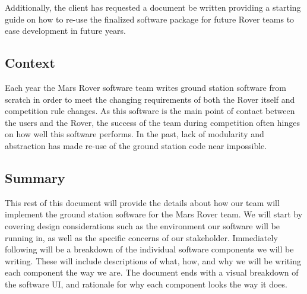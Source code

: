 Additionally, the client has requested a document be written providing a starting guide on how to re-use the finalized software package for future Rover teams to ease development in future years.


\subsection{Context}
Each year the Mars Rover software team writes ground station software from scratch in order to meet the changing requirements of both the Rover itself and competition rule changes.
As this software is the main point of contact between the users and the Rover, the success of the team during competition often hinges on how well this software performs.
In the past, lack of modularity and abstraction has made re-use of the ground station code near impossible.


\subsection{Summary}
This rest of this document will provide the details about how our team will implement the ground station software for the Mars Rover team.
We will start by covering design considerations such as the environment our software will be running in, as well as the specific concerns of our stakeholder. 
Immediately following will be a breakdown of the individual software components we will be writing.
These will include descriptions of what, how, and why we will be writing each component the way we are.
The document ends with a visual breakdown of the software UI, and rationale for why each component looks the way it does.